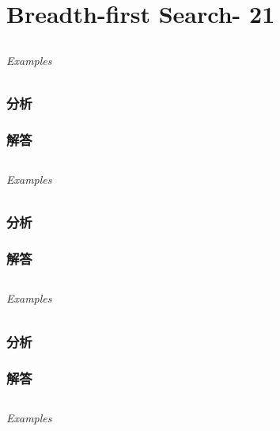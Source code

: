 \documentclass[UTF8,a4paper,12pt]{ctexbook}
\begin{document}
\chapter{Breadth-first Search- 21}
\section{}
	
	\subparagraph{Examples}
	
	\subsection{分析}
	
	\subsection{解答}
	
\section{}
	
	\subparagraph{Examples}
	
	\subsection{分析}
	
	\subsection{解答}
	
\section{}
	
	\subparagraph{Examples}
	
	\subsection{分析}
	
	\subsection{解答}
	
\section{}
	
	\subparagraph{Examples}
	
\end{document}

